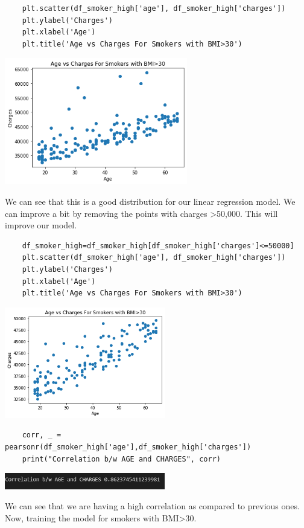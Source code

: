 \documentclass[12pt]{article}
\numberwithin{equation}{section}
\begin{document}
{\begin{lstlisting}
	plt.scatter(df_smoker_high['age'], df_smoker_high['charges'])
	plt.ylabel('Charges')
	plt.xlabel('Age')
	plt.title('Age vs Charges For Smokers with BMI>30')
\end{lstlisting}
\begin{center}
\includegraphics[width=8cm]{work7}
\end{center}
We can see that this is a good distribution for our linear regression model. We can improve a bit by removing the points with charges >50,000. This will improve our model.
\begin{lstlisting}
	df_smoker_high=df_smoker_high[df_smoker_high['charges']<=50000]
	plt.scatter(df_smoker_high['age'], df_smoker_high['charges'])
	plt.ylabel('Charges')
	plt.xlabel('Age')
	plt.title('Age vs Charges For Smokers with BMI>30')
\end{lstlisting}
\begin{center}
\includegraphics[width=7cm]{work8}
\end{center}
\begin{lstlisting}
	corr, _ = pearsonr(df_smoker_high['age'],df_smoker_high['charges'])
	print("Correlation b/w AGE and CHARGES", corr)
\end{lstlisting}
\begin{center}
\includegraphics[width=7cm]{work9}
\end{center}
We can see that we are having a high correlation as compared to previous ones. Now, training the model for smokers with BMI>30.
}
\end{document}

